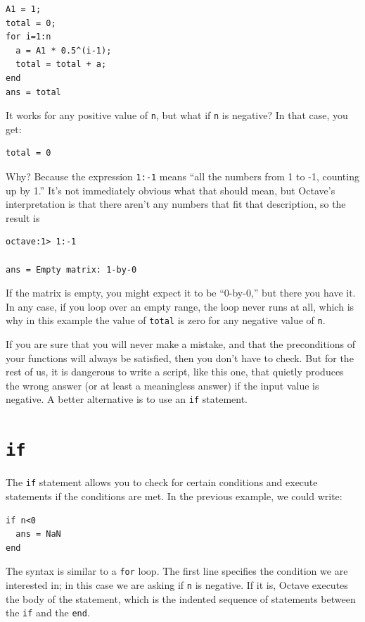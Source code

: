 \documentclass{book}
\begin{document}
\begin{verbatim}
A1 = 1;
total = 0;
for i=1:n
  a = A1 * 0.5^(i-1);
  total = total + a;
end
ans = total
\end{verbatim}

It works for any positive value of {\tt n}, but what if {\tt n}
is negative? In that case, you get:

\begin{verbatim}
total = 0
\end{verbatim}

Why? Because the expression {\tt 1:-1} means ``all the numbers
from 1 to -1, counting up by 1.'' It's not immediately obvious
what that should mean, but Octave's interpretation is that there
aren't any numbers that fit that description, so the result is

\begin{verbatim}
octave:1> 1:-1

ans = Empty matrix: 1-by-0
\end{verbatim}

If the matrix is empty, you might expect it to be ``0-by-0,'' but
there you have it. In any case, if you loop over an empty range,
the loop never runs at all, which is why in this example the
value of {\tt total} is zero for any negative value of {\tt n}.

If you are sure that you will never make a mistake, and that the
preconditions of your functions will always be satisfied, then you
don't have to check. But for the rest of us, it is dangerous to write
a script, like this one, that quietly produces the wrong answer (or
at least a meaningless answer) if the input value is negative.
A better alternative is to use an {\tt if} statement.


\section{{\tt if}}

The {\tt if} statement allows you to check for certain conditions
and execute statements if the conditions are met. In the previous
example, we could write:

\begin{verbatim}
if n<0
  ans = NaN
end
\end{verbatim}

The syntax is similar to a {\tt for} loop. The first line
specifies the condition we are interested in; in this case we
are asking if {\tt n} is negative. If it is, Octave executes
the body of the statement, which is the indented sequence of
statements between the {\tt if} and the {\tt end}.
\end{document}
